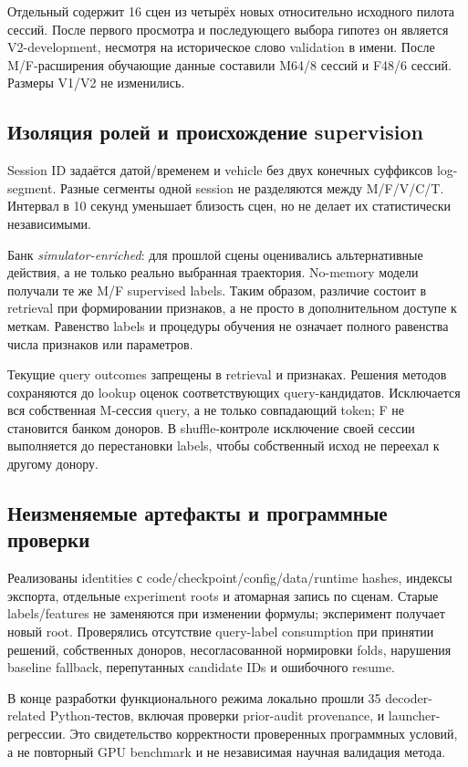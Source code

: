 \documentclass[11pt,a4paper]{article}
\newcommand{\code}[1]{\texttt{\detokenize{#1}}}
\begin{document}
Отдельный \code{validation_cached4_v1} содержит 16 сцен из четырёх новых относительно исходного пилота сессий. После первого просмотра и последующего выбора гипотез он является V2-development, несмотря на историческое слово validation в имени. После M/F-расширения обучающие данные составили M64/8 сессий и F48/6 сессий. Размеры V1/V2 не изменились.

\subsection{Изоляция ролей и происхождение supervision}
Session ID задаётся датой/временем и vehicle без двух конечных суффиксов log-segment. Разные сегменты одной session не разделяются между M/F/V/C/T. Интервал в 10 секунд уменьшает близость сцен, но не делает их статистически независимыми.

Банк \emph{simulator-enriched}: для прошлой сцены оценивались альтернативные действия, а не только реально выбранная траектория. No-memory модели получали те же M/F supervised labels. Таким образом, различие состоит в retrieval при формировании признаков, а не просто в дополнительном доступе к меткам. Равенство labels и процедуры обучения не означает полного равенства числа признаков или параметров.

Текущие query outcomes запрещены в retrieval и признаках. Решения методов сохраняются до lookup оценок соответствующих query-кандидатов. Исключается вся собственная M-сессия query, а не только совпадающий token; F не становится банком доноров. В shuffle-контроле исключение своей сессии выполняется до перестановки labels, чтобы собственный исход не переехал к другому донору.

\subsection{Неизменяемые артефакты и программные проверки}
Реализованы identities с code/checkpoint/config/data/runtime hashes, индексы экспорта, отдельные experiment roots и атомарная запись по сценам. Старые labels/features не заменяются при изменении формулы; эксперимент получает новый root. Проверялись отсутствие query-label consumption при принятии решений, собственных доноров, несогласованной нормировки folds, нарушения baseline fallback, перепутанных candidate IDs и ошибочного resume.

В конце разработки функционального режима локально прошли 35 decoder-related Python-тестов, включая проверки prior-audit provenance, и launcher-регрессии. Это свидетельство корректности проверенных программных условий, а не повторный GPU benchmark и не независимая научная валидация метода.
\end{document}
